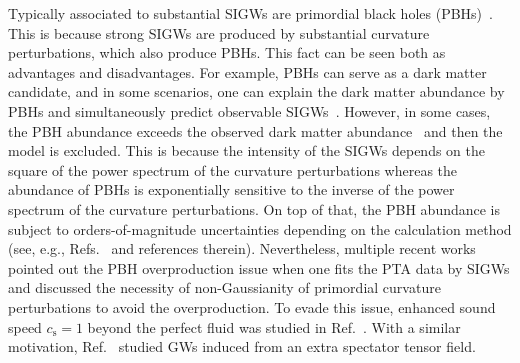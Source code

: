 \documentclass[superscriptaddress, aps, preprintnumbers,
amsmath, amssymb, sort&compress, nofootinbib, 10pt, paper, floatfix]{revtex4-2}
\begin{document}
Typically associated to substantial SIGWs are primordial black holes (PBHs)~\cite{Saito:2008jc, Saito:2009jt, Bugaev:2009zh}. This is because strong SIGWs are produced by substantial curvature perturbations, which also produce PBHs. This fact can be seen both as advantages and disadvantages. For example, PBHs can serve as a dark matter candidate, and in some scenarios, one can explain the dark matter abundance by PBHs and simultaneously predict observable SIGWs~\cite{Saito:2008jc, Garcia-Bellido:2017aan, Inomata:2017vxo,Bartolo:2018rku}. However, in some cases, the PBH abundance exceeds the observed dark matter abundance~\cite{Kawasaki:2015ppx,Pattison:2017mbe,Ezquiaga:2019ftu, Tada:2023pue} and then the model is excluded. This is because the intensity of the SIGWs depends on the square of the power spectrum of the curvature perturbations whereas the abundance of PBHs is exponentially sensitive to the inverse of the power spectrum of the curvature perturbations. On top of that, the PBH abundance is subject to orders-of-magnitude uncertainties depending on the calculation method (see, e.g., Refs.~\cite{Ando:2018qdb, Young:2019osy, Yoo:2020dkz, DeLuca:2023tun} and references therein). Nevertheless, multiple recent works~\cite{Dandoy:2023jot, Franciolini:2023pbf, Liu:2023ymk} pointed out the PBH overproduction issue when one fits the PTA data by SIGWs and discussed the necessity of non-Gaussianity of primordial curvature perturbations to avoid the overproduction.
To evade this issue, enhanced sound speed $c_\text{s}=1$ beyond the perfect fluid was studied in Ref.~\cite{Balaji:2023ehk}. With a similar motivation, Ref.~\cite{Gorji:2023sil} studied GWs induced from an extra spectator tensor field.  
\end{document}
